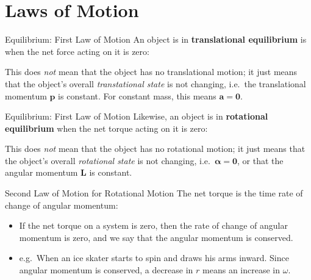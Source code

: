 \documentclass[12pt,compress,aspectratio=169]{beamer}
\begin{document}
\section{Laws of Motion}

\begin{frame}{Equilibrium: First Law of Motion}
  An object is in \textbf{translational equilibrium} is when the net force
  acting on it is zero:
  

  This does \emph{not} mean that the object has no translational motion; it
  just means that the object's overall \emph{transtational state} is not
  changing, i.e.\ the translational momentum $\bm{p}$ is constant. For
  constant mass, this means $\bm{a}=\bm{0}$.
\end{frame}




\begin{frame}{Equilibrium: First Law of Motion}
  Likewise, an object is in \textbf{rotational equilibrium} when the net torque
  acting on it is zero:

  
  This does \emph{not} mean that the object has no rotational motion; it just
  means that the object's overall \emph{rotational state} is not changing,
  i.e.\ $\bm{\alpha}=\bm{0}$, or that the angular momentum $\bm{L}$ is constant.
\end{frame}



\begin{frame}{Second Law of Motion for Rotational Motion}
  The net torque is the time rate of change of angular momentum:

  \begin{itemize}
  \item If the net torque on a system is zero, then the rate of change
    of angular momentum is zero, and we say that the angular momentum is
    conserved. 
  \item e.g.\ When an ice skater starts to spin and draws his arms inward.
    Since angular momentum is conserved, a decrease in $r$ means an
    increase in $\omega$.
  \end{itemize}
\end{frame}
\end{document}
